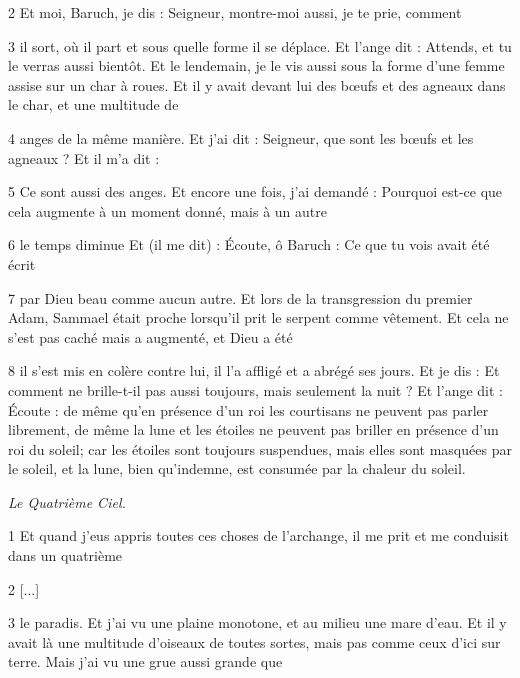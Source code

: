 \par 2 Et moi, Baruch, je dis : Seigneur, montre-moi aussi, je te prie, comment

\par 3 il sort, où il part et sous quelle forme il se déplace. Et l'ange dit : Attends, et tu le verras aussi bientôt. Et le lendemain, je le vis aussi sous la forme d'une femme assise sur un char à roues. Et il y avait devant lui des bœufs et des agneaux dans le char, et une multitude de

\par 4 anges de la même manière. Et j'ai dit : Seigneur, que sont les bœufs et les agneaux ? Et il m'a dit :

\par 5 Ce sont aussi des anges. Et encore une fois, j'ai demandé : Pourquoi est-ce que cela augmente à un moment donné, mais à un autre

\par 6 le temps diminue Et (il me dit) : Écoute, ô Baruch : Ce que tu vois avait été écrit

\par 7 par Dieu beau comme aucun autre. Et lors de la transgression du premier Adam, Sammael était proche lorsqu'il prit le serpent comme vêtement. Et cela ne s'est pas caché mais a augmenté, et Dieu a été

\par 8 il s'est mis en colère contre lui, il l'a affligé et a abrégé ses jours. Et je dis : Et comment ne brille-t-il pas aussi toujours, mais seulement la nuit ? Et l'ange dit : Écoute : de même qu'en présence d'un roi les courtisans ne peuvent pas parler librement, de même la lune et les étoiles ne peuvent pas briller en présence d'un roi du soleil; car les étoiles sont toujours suspendues, mais elles sont masquées par le soleil, et la lune, bien qu'indemne, est consumée par la chaleur du soleil.


\par \textit{Le Quatrième Ciel.}

\par 1 Et quand j'eus appris toutes ces choses de l'archange, il me prit et me conduisit dans un quatrième

\par 2 [...]

\par 3 le paradis. Et j'ai vu une plaine monotone, et au milieu une mare d'eau. Et il y avait là une multitude d’oiseaux de toutes sortes, mais pas comme ceux d’ici sur terre. Mais j'ai vu une grue aussi grande que

